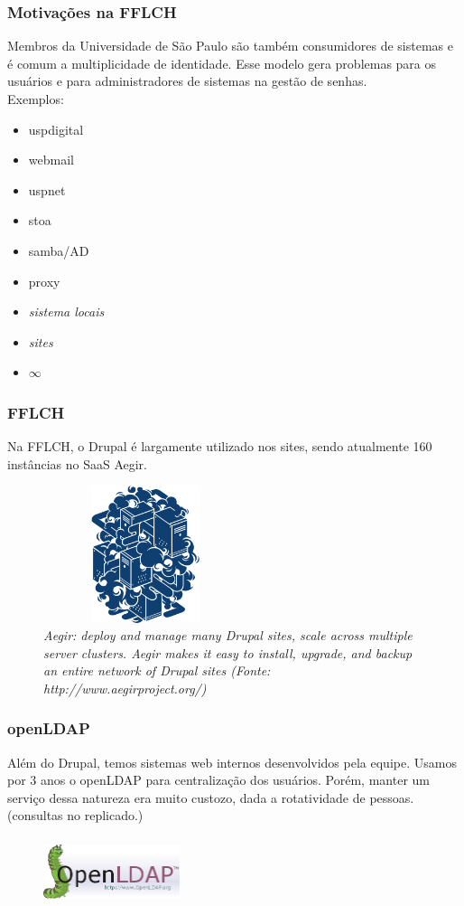 \begin{frame}
  \titlepage
\end{frame}

\begin{frame}\frametitle{Motivações na FFLCH}
  Membros da Universidade de São Paulo são também consumidores de sistemas e é comum a multiplicidade de identidade. 
Esse modelo gera problemas para os usuários e para administradores de sistemas na gestão de senhas. \\
Exemplos:
\begin{itemize}
  \item uspdigital
  \item webmail
  \item uspnet
  \item stoa
  \item samba/AD
  \item proxy
  \item \textit{sistema locais}
  \item \textit{sites}
  \item $\infty$
\end{itemize}
\end{frame}

\begin{frame}\frametitle{FFLCH}
Na FFLCH, o Drupal é largamente utilizado nos sites, sendo atualmente 160 instâncias no SaaS Aegir. 
    \begin{figure}
      \caption{\textit{Aegir: deploy and manage many Drupal sites, scale across multiple server clusters. Aegir makes it easy to install, upgrade, and backup an entire network of Drupal sites (Fonte: http://www.aegirproject.org/)} }
      \includegraphics[width=6cm,height=4cm]{images/aegir-illo.png}
    \end{figure}
\end{frame}

\begin{frame}\frametitle{openLDAP}
Além do Drupal, temos sistemas web internos desenvolvidos pela equipe. 
Usamos por 3 anos o openLDAP para centralização dos usuários. Porém, manter um serviço dessa natureza era muito custozo, dada a rotatividade de pessoas.
(consultas no replicado.)
\begin{figure}
  \includegraphics[width=4cm,height=2cm]{images/OpenLDAP-logo.png}
\end{figure}
\end{frame}

